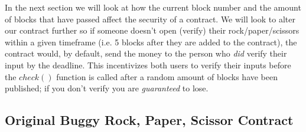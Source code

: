 \documentclass[12pt]{article}
\begin{document}
In the next section we will look at how the current block number and the amount of blocks that have passed affect the security of a contract. We will look to alter our contract further so if someone doesn't open (verify) their rock/paper/scissors within a given timeframe (i.e. 5 blocks after they are added to the contract), the contract would, by default, send the money to the person who \textit{did} verify their input by the deadline. This incentivizes both users to verify their inputs before the $check()$ function is called after a random amount of blocks have been published; if you don't verify you are \textit{guaranteed} to lose.


\subsection{Original Buggy Rock, Paper, Scissor Contract}
\end{document}
